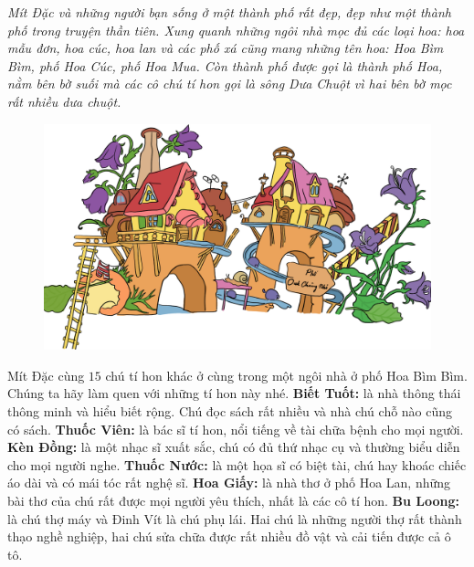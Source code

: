	\begin{multicols}{2}
		\textit{Mít Đặc và những người bạn sống ở một thành phố rất đẹp, đẹp như một thành phố trong truyện thần tiên. Xung quanh những ngôi nhà mọc đủ các loại hoa: hoa mẫu đơn, hoa cúc, hoa lan và các phố xá cũng mang những tên hoa: Hoa Bìm Bìm, phố Hoa Cúc, phố Hoa Mua. Còn thành phố được gọi là thành phố Hoa, nằm bên bờ suối mà các cô chú tí hon gọi là sông Dưa Chuột vì hai bên bờ mọc rất nhiều dưa chuột.}
		\begin{figure}[H]
			\centering
			\vspace*{-5pt}
			\captionsetup{labelformat= empty, justification=centering}
			\includegraphics[width=1\linewidth]{Hinh1_TPHoa}
			\vspace*{-5pt}
		\end{figure}
	\end{multicols}
	Mít Đặc cùng $15$ chú tí hon khác ở cùng trong một ngôi nhà ở phố Hoa Bìm Bìm. Chúng ta hãy làm quen với những tí hon này nhé.
	\vskip 0.1cm
	\textbf{\color{toancuabi}Biết Tuốt:} là nhà thông thái thông minh và hiểu biết rộng. Chú đọc sách rất nhiều và nhà chú chỗ nào cũng có sách.
	\vskip 0.1cm
	\textbf{\color{toancuabi}Thuốc Viên:} là bác sĩ tí hon, nổi tiếng về tài chữa bệnh cho mọi người.
	\vskip 0.1cm
	\textbf{\color{toancuabi}Kèn Đồng:} là một nhạc sĩ xuất sắc, chú có đủ thứ nhạc cụ và thường biểu diễn cho mọi người nghe.
	\vskip 0.1cm
	\textbf{\color{toancuabi}Thuốc Nước:} là một họa sĩ có biệt tài, chú hay khoác chiếc áo dài và có mái tóc rất nghệ sĩ.
	\vskip 0.1cm
	\textbf{\color{toancuabi}Hoa Giấy:} là nhà thơ ở phố Hoa Lan, những bài thơ của chú rất được mọi người yêu thích, nhất là các cô tí hon.
	\vskip 0.1cm
	\textbf{\color{toancuabi}Bu Loong:} là chú thợ máy và Đinh Vít là chú phụ lái. Hai chú là những người thợ rất thành thạo nghề nghiệp, hai chú sửa chữa được rất nhiều đồ vật và cải tiến được cả ô tô.
